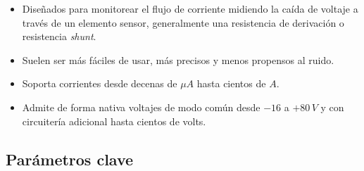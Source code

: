 \documentclass[
10pt, %
a4paper, %
oneside, %
headinclude,footinclude, %
BCOR5mm, %
]{scrartcl}
\begin{document}
\begin{itemize}
	\item Diseñados para monitorear el flujo de corriente midiendo la caída de voltaje a través de un elemento sensor, generalmente una resistencia de derivación o resistencia \textit{shunt}.
	
	\item Suelen ser más fáciles de usar, más precisos y menos propensos al ruido. 
	
	\item Soporta corrientes desde decenas de $\mu A$ hasta cientos de $A$.
	
	\item Admite de forma nativa voltajes de modo común desde $-16$ a $+80 \, V$ y con circuitería adicional hasta cientos de volts.
\end{itemize}

\subsection{Parámetros clave}
\end{document}
